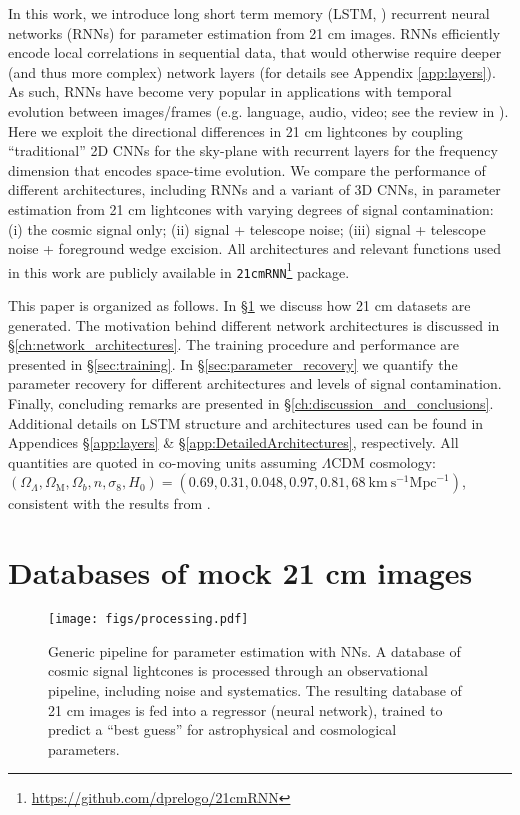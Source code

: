 \documentclass[fleqn,usenatbib]{mnras}
\begin{document}
In this work, we introduce long short term memory (LSTM, \citealt{LSTM}) recurrent neural networks (RNNs) for parameter estimation from 21 cm images.  RNNs efficiently encode local correlations in sequential data, that would otherwise require deeper (and thus more complex) network layers (for details see Appendix \ref{app:layers}).  As such, RNNs have become very popular in applications with temporal evolution between images/frames (e.g. language, audio, video; see the review in \citealt{Schmidt19}). 
Here we exploit the directional differences in 21 cm lightcones by coupling ``traditional'' 2D CNNs for the sky-plane with recurrent layers for the frequency dimension that encodes space-time evolution.
We compare the performance of different architectures, including RNNs and  a variant of 3D CNNs, in parameter estimation from 21 cm lightcones with varying degrees of signal contamination: (i) the cosmic signal only; (ii) signal + telescope noise; (iii) signal + telescope noise + foreground wedge excision. 
All architectures and relevant functions used in this work are publicly available in \texttt{21cmRNN}\footnote{\url{https://github.com/dprelogo/21cmRNN}} package. 

This paper is organized as follows. In \S\ref{ch:mock_21cm_images} we discuss how 21 cm datasets are generated. The motivation behind different network architectures is discussed in \S\ref{ch:network_architectures}. The training procedure and performance are presented in \S\ref{sec:training}. In \S\ref{sec:parameter_recovery} we quantify the parameter recovery for different architectures and levels of signal contamination.  Finally, concluding remarks are presented in \S\ref{ch:discussion_and_conclusions}. Additional details on LSTM structure and architectures used can be found in Appendices \S\ref{app:layers} \& \S\ref{app:DetailedArchitectures}, respectively. All quantities are quoted in co-moving units assuming $\Lambda\mathrm{CDM}$ cosmology: $\left(\Omega_{\Lambda}, \Omega_{\mathrm{M}}, \Omega_{b}, n, \sigma_{8}, H_{0}\right) =\left(0.69,0.31,0.048,0.97,0.81,68 \mathrm{~km} \mathrm{~s}^{-1} \mathrm{Mpc}^{-1}\right)$, consistent with the results from \cite{planck_2018}. 

\section{Databases of mock 21 cm images} \label{ch:mock_21cm_images}

\begin{figure}
    \centering
    \texttt{[image: figs/processing.pdf]}
    \caption{Generic pipeline for parameter estimation with NNs. A database of cosmic signal lightcones is processed through an observational pipeline, including noise and systematics. The resulting database of 21 cm images is fed into a regressor (neural network), trained to predict a “best guess” for astrophysical and cosmological parameters.}
    \label{fig:processing}
\end{figure}
\end{document}
